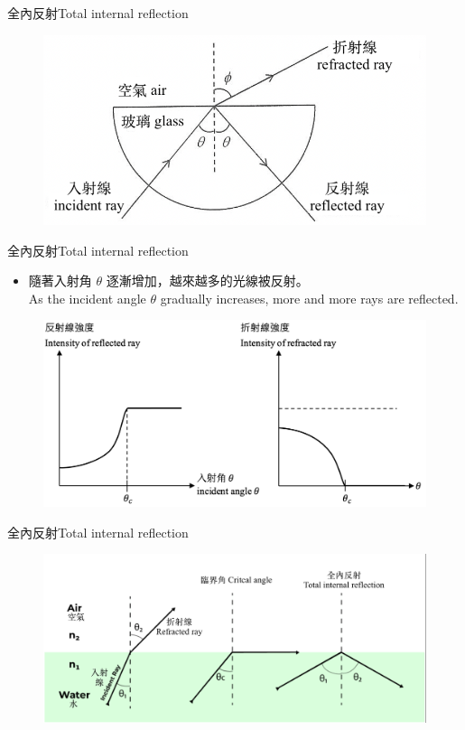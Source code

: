 \documentclass[beamer=true]{standalone}
\begin{document}
\begin{frame}{全內反射Total internal reflection}
    \begin{figure}
        \centering
        \includegraphics[width=0.6\linewidth]{assets/dqdwqdddd212.png}
        
        
    \end{figure}
\end{frame}

\begin{frame}{全內反射Total internal reflection}
    \begin{itemize}
        \item 隨著入射角 $\theta$ 逐漸增加，越來越多的光線被反射。\\As the incident angle $\theta$ gradually increases, more and more rays are reflected.
    \end{itemize}\medskip
    \begin{figure}
        \centering
        \includegraphics[width=0.9\linewidth]{assets/jd929828un2n32.png}
        
        
    \end{figure}
\end{frame}

\begin{frame}{全內反射Total internal reflection}
    \begin{figure}
        \centering
        \includegraphics[width=1\linewidth]{assets/2839274194872184age.png}
    \end{figure}
\end{frame}
\end{document}
